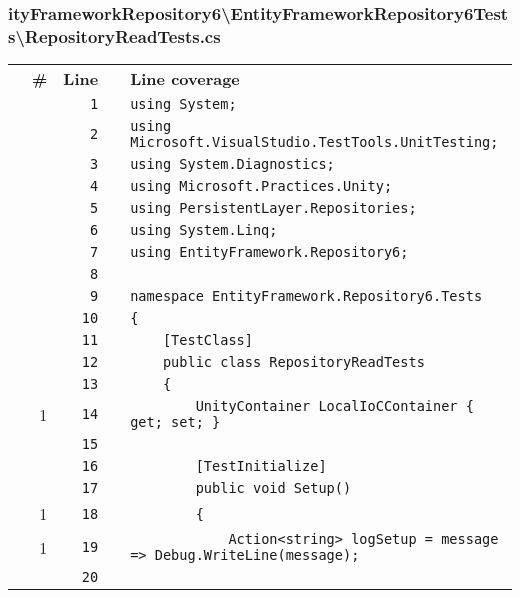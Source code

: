 \documentclass[a4paper,10pt]{article}
\begin{document}
\subsubsection{ityFrameworkRepository6\textbackslash EntityFrameworkRepository6Tests\textbackslash RepositoryReadTests.cs}
\begin{longtable}[l]{lrrll}
\textbf{} & \textbf{\#} & \textbf{Line} & \textbf{} & \textbf{Line coverage}\\
\cellcolor{gray} &  & \verb~1~ & & \verb~using System;~\\
\cellcolor{gray} &  & \verb~2~ & & \verb~using Microsoft.VisualStudio.TestTools.UnitTesting;~\\
\cellcolor{gray} &  & \verb~3~ & & \verb~using System.Diagnostics;~\\
\cellcolor{gray} &  & \verb~4~ & & \verb~using Microsoft.Practices.Unity;~\\
\cellcolor{gray} &  & \verb~5~ & & \verb~using PersistentLayer.Repositories;~\\
\cellcolor{gray} &  & \verb~6~ & & \verb~using System.Linq;~\\
\cellcolor{gray} &  & \verb~7~ & & \verb~using EntityFramework.Repository6;~\\
\cellcolor{gray} &  & \verb~8~ & & \verb~~\\
\cellcolor{gray} &  & \verb~9~ & & \verb~namespace EntityFramework.Repository6.Tests~\\
\cellcolor{gray} &  & \verb~10~ & & \verb~{~\\
\cellcolor{gray} &  & \verb~11~ & & \verb~    [TestClass]~\\
\cellcolor{gray} &  & \verb~12~ & & \verb~    public class RepositoryReadTests~\\
\cellcolor{gray} &  & \verb~13~ & & \verb~    {~\\
\cellcolor{green} & 1 & \verb~14~ & & \verb~        UnityContainer LocalIoCContainer { get; set; }~\\
\cellcolor{gray} &  & \verb~15~ & & \verb~~\\
\cellcolor{gray} &  & \verb~16~ & & \verb~        [TestInitialize]~\\
\cellcolor{gray} &  & \verb~17~ & & \verb~        public void Setup()~\\
\cellcolor{green} & 1 & \verb~18~ & & \verb~        {~\\
\cellcolor{green} & 1 & \verb~19~ & & \verb~            Action<string> logSetup = message => Debug.WriteLine(message);~\\
\cellcolor{gray} &  & \verb~20~ & & \verb~~\\

\end{longtable}
\end{document}
